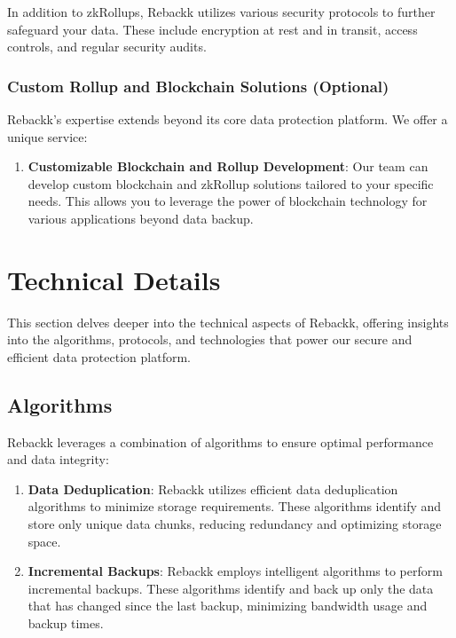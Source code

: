 \documentclass[12pt]{article}
\begin{document}
In addition to zkRollups, Rebackk utilizes various security protocols to further safeguard your data. These include encryption at rest and in transit, access controls, and regular security audits.

\subsubsection{Custom Rollup and Blockchain Solutions (Optional)}

Rebackk's expertise extends beyond its core data protection platform. We offer a unique service:

\begin{enumerate}
    \item \textbf{Customizable Blockchain and Rollup Development}: Our team can develop custom blockchain and zkRollup solutions tailored to your specific needs. This allows you to leverage the power of blockchain technology for various applications beyond data backup.
\end{enumerate}
\newpage


\section{Technical Details}

This section delves deeper into the technical aspects of Rebackk, offering insights into the algorithms, protocols, and technologies that power our secure and efficient data protection platform.

\subsection{Algorithms}

Rebackk leverages a combination of algorithms to ensure optimal performance and data integrity:

\begin{enumerate}
    \item \textbf{Data Deduplication}: Rebackk utilizes efficient data deduplication algorithms to minimize storage requirements. These algorithms identify and store only unique data chunks, reducing redundancy and optimizing storage space.
    \item \textbf{Incremental Backups}: Rebackk employs intelligent algorithms to perform incremental backups. These algorithms identify and back up only the data that has changed since the last backup, minimizing bandwidth usage and backup times.
\end{enumerate}
\end{document}
